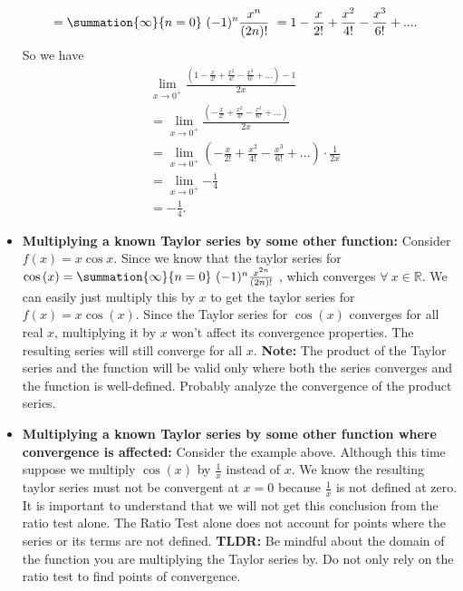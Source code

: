 \documentclass{report}
\begin{document}
\begin{itemize}
\begin{align*}
                                            &=\summation{\infty}{n=0}\ (-1)^{n}\frac{x^{n}}{(2n)!}\   = 1 - \frac{x}{2!} + \frac{x^{2}}{4!} - \frac{x^{3}}{6!} + ... 
                                        .\end{align*}
                                        So we have
                                        \begin{align*}
                    &\lim\limits_{x \to 0^{+}}{\frac{\left(1-\frac{x}{2!}+\frac{x^{2}}{4!}-\frac{x^{3}}{6!} + ...\right)-1}{2x}}\\
                    &=\lim\limits_{x \to 0^{+}}{\frac{\left(-\frac{x}{2!}+\frac{x^{2}}{4!}-\frac{x^{3}}{6!} + ...\right)}{2x}}\\
                    &=\lim\limits_{x \to 0^{+}}\left(-\frac{x}{2!}+\frac{x^{2}}{4!}-\frac{x^{3}}{6!} + ...\right)\cdot \frac{1}{2x}\\
                    &=\lim\limits_{x \to 0^{+}}{-\frac{1}{4}} \\
                    &=-\frac{1}{4}
                .\end{align*}
            \item \textbf{Multiplying a known Taylor series by some other function:} Consider $f(x) = x\cos{x}$. Since we know that the taylor series for $\cos{(x)} = \summation{\infty}{n=0}\ (-1)^{n}\frac{x^{2n}}{(2n)!}\ $, which converges $\forall\ x \in \mathbb{R} $. We can easily just multiply this by $x$ to get the taylor series for $f(x) = x\cos{(x)}$.  Since the Taylor series for $\cos{(x)}$ converges for all real $x$, multiplying it by  $x$ won't affect its convergence properties. The resulting series will still converge for all $x$.
                \bigbreak \noindent 
                \textbf{Note:} The product of the Taylor series and the function will be valid only where both the series converges and the function is well-defined. Probably analyze the convergence of the product series.
            \item \textbf{Multiplying a known Taylor series by some other function where convergence is affected:} Consider the example above. Although this time suppose we multiply $\cos{(x)}$ by $\frac{1}{x} $ instead of $x$. We know the resulting taylor series must not be convergent at $x=0$ because $\frac{1}{x}$ is not defined at zero. It is important to understand that we will not get this conclusion from the ratio test alone. The Ratio Test alone does not account for points where the series or its terms are not defined.
                \bigbreak \noindent 
                \textbf{TLDR:} Be mindful about the domain of the function you are multiplying the Taylor series by. Do not only rely on the ratio test to find points of convergence.

\end{itemize}
\end{document}
